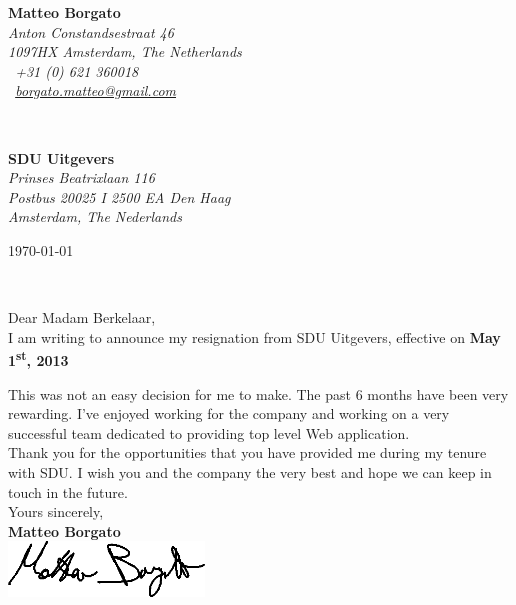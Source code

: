 \documentclass[11pt]{article}
\begin{document}
\sffamily   %
\hfill%
\begin{minipage}[t]{.6\textwidth}
\raggedleft%
{\bfseries Matteo Borgato}\\[.35ex]
\small\itshape%
Anton Constandsestraat 46\\
1097HX Amsterdam, The Netherlands\\[.35ex]
\Telefon~+31 (0) 621 360018\\
\Letter~\href{mailto:borgato.matteo@gmail.com}{borgato.matteo@gmail.com}
\end{minipage}\\[1em]
%
\begin{minipage}[t]{.4\textwidth}
\raggedright%
{\bfseries SDU Uitgevers}\\[.35ex]
\small\itshape%
Prinses Beatrixlaan 116 \\ 
Postbus 20025 I 2500 EA Den Haag \\
Amsterdam, The Nederlands
\end{minipage}
\hfill %
\begin{minipage}[t]{.4\textwidth}
\raggedleft %
\today
\end{minipage}\\[2em]
\raggedright
Dear Madam Berkelaar,\\[0.5em]
%
 I am writing to announce my resignation from SDU Uitgevers, effective on {\bfseries May 1\textsuperscript{st}, 2013}

This was not an easy decision for me to make. The past 6 months have been very rewarding. I've enjoyed working for the company and working on a very successful team dedicated to providing top level Web application.
\\[1.5em]

Thank you for the opportunities that you have provided me during my tenure with SDU.
I wish you and the company the very best and hope we can keep in touch in the future.
\\[2.5em]

Yours sincerely,
%
\\ {\bfseries Matteo Borgato}
\\
\hfill{ \includegraphics[width=52mm]{firma.png}}



%
\vfill%
\end{document}
